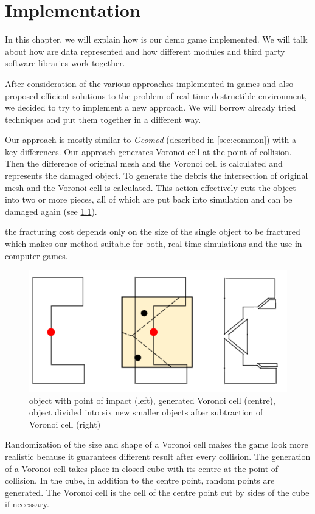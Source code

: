 \chapter{Implementation}
In this chapter, we will explain how is our demo game implemented. We will talk about how are data represented and how different modules and third party software libraries work together.

After consideration of the various approaches implemented in games and also proposed efficient solutions to the problem of real-time destructible environment, we decided to try to implement a new approach. We will borrow already tried techniques and put them together in a different way.

Our approach is mostly similar to \emph{Geomod} (described in \cref{sec:common}) with a key differences. Our approach generates Voronoi cell at the point of collision. Then the difference of original mesh and the Voronoi cell is calculated and represents the damaged object. To generate the debris the intersection of original mesh and the Voronoi cell is calculated. This action effectively cuts the object into two or more pieces, all of which are put back into simulation and can be damaged again (see \cref{fig:subtraction}).

 the fracturing cost depends only on the size of
the single object to be fractured which makes our method suitable
for both, real time simulations and the use in computer games.

\begin{figure}
        \centering
        \includegraphics[width=\textwidth]{img/subtractionProcess}
        \caption{object with point of impact (left), generated Voronoi cell (centre), object divided into six new smaller objects after subtraction of Voronoi cell (right)}
        \label{fig:subtraction}
\end{figure}

Randomization of the size and shape of a Voronoi cell makes the game look more realistic because it guarantees different result after every collision. The generation of a Voronoi cell takes place in closed cube with its centre at the point of collision. In the cube, in addition to the centre point, random points are generated. The Voronoi cell is the cell of the centre point cut by sides of the cube if necessary.

